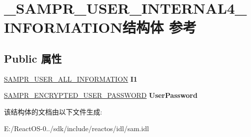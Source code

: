 \hypertarget{struct___s_a_m_p_r___u_s_e_r___i_n_t_e_r_n_a_l4___i_n_f_o_r_m_a_t_i_o_n}{}\section{\+\_\+\+S\+A\+M\+P\+R\+\_\+\+U\+S\+E\+R\+\_\+\+I\+N\+T\+E\+R\+N\+A\+L4\+\_\+\+I\+N\+F\+O\+R\+M\+A\+T\+I\+O\+N结构体 参考}
\label{struct___s_a_m_p_r___u_s_e_r___i_n_t_e_r_n_a_l4___i_n_f_o_r_m_a_t_i_o_n}
\subsection*{Public 属性}
\begin{DoxyCompactItemize}
\item 
\mbox{\label{struct___s_a_m_p_r___u_s_e_r___i_n_t_e_r_n_a_l4___i_n_f_o_r_m_a_t_i_o_n_ab2584ba84c925696232572b60aa704c4}} 
\hyperlink{struct___s_a_m_p_r___u_s_e_r___a_l_l___i_n_f_o_r_m_a_t_i_o_n}{S\+A\+M\+P\+R\+\_\+\+U\+S\+E\+R\+\_\+\+A\+L\+L\+\_\+\+I\+N\+F\+O\+R\+M\+A\+T\+I\+ON} {\bfseries I1}
\item 
\mbox{\label{struct___s_a_m_p_r___u_s_e_r___i_n_t_e_r_n_a_l4___i_n_f_o_r_m_a_t_i_o_n_a4d5bd7cf42986ff6e4c72ea367bf4768}} 
\hyperlink{struct___s_a_m_p_r___e_n_c_r_y_p_t_e_d___u_s_e_r___p_a_s_s_w_o_r_d}{S\+A\+M\+P\+R\+\_\+\+E\+N\+C\+R\+Y\+P\+T\+E\+D\+\_\+\+U\+S\+E\+R\+\_\+\+P\+A\+S\+S\+W\+O\+RD} {\bfseries User\+Password}
\end{DoxyCompactItemize}


该结构体的文档由以下文件生成\+:\begin{DoxyCompactItemize}
\item 
E\+:/\+React\+O\+S-\/0../sdk/include/reactos/idl/sam.\+idl\end{DoxyCompactItemize}
